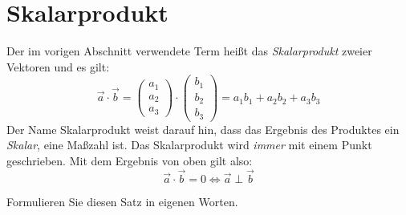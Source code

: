 \documentclass[12pt,a4paper,twoside,fleqn]{article}
\begin{document}
\section{Skalarprodukt}
Der im vorigen Abschnitt verwendete Term heißt das {\em
  Skalarprodukt} zweier Vektoren und es gilt:
$$ \vec{a} \cdot \vec{b} =
\begin{pmatrix}
        a_1\\a_2\\a_3
      \end{pmatrix} \cdot
      \begin{pmatrix}
        b_1\\b_2\\b_3
      \end{pmatrix} = 
      a_1b_1 + a_2b_2+a_3b_3$$
Der Name Skalarprodukt weist darauf hin, dass das Ergebnis des
Produktes ein {\em Skalar}, eine Maßzahl ist. Das Skalarprodukt wird
{\em immer} mit einem Punkt geschrieben.
Mit dem Ergebnis von oben gilt also:
$$\vec{a}\cdot\vec{b} = 0 \Leftrightarrow \vec{a}\perp\vec{b}$$

Formulieren Sie diesen Satz in eigenen Worten.
\end{document}
